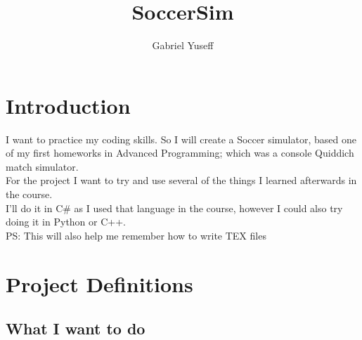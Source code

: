 \documentclass{article}
\title{SoccerSim}
\author{Gabriel Yuseff}
\theoremstyle{mytheoremstyle}
\theoremstyle{mytheoremstyle}
\theoremstyle{myproblemstyle}
\begin{document}
    \maketitle
    \section{Introduction}
    \vspace{1px}
    I want to practice my coding skills. So I will create a Soccer simulator, based one of my first homeworks in Advanced Programming; which was a console Quiddich match simulator.\\
    For the project I want to try and use several of the things I learned afterwards in the course.\\
    I'll do it in C\# as I used that language in the course, however I could also try doing it in Python or C++.\\
    PS: This will also help me remember how to write TEX files
    \newpage
    \section{Project Definitions}
    
    \subsection{What I want to do}
\end{document}
